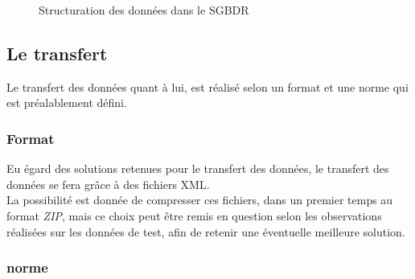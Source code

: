 \begin{figure}[htbp]
	\caption{Structuration des données dans le SGBDR}
	\label{DonneesStructurationSgbdr}
\end{figure}


\subsection{Le transfert}
Le transfert des données quant à lui, est réalisé selon un format et une norme qui est préalablement défini.

\subsubsection{Format}
Eu égard des solutions retenues pour le transfert des données, le transfert des données se fera grâce à des fichiers XML. \\
La possibilité est donnée de compresser ces fichiers, dans un premier temps au format \emph{ZIP}, mais ce choix peut être remis en question selon les observations réalisées sur les données de test, afin de retenir une éventuelle meilleure solution.

\subsubsection{norme}
% 
% 

